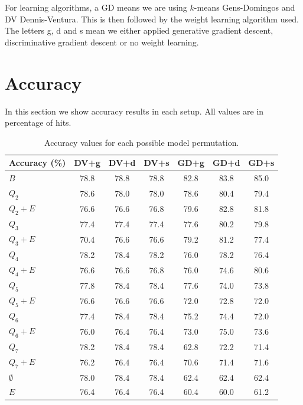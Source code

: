 For learning algorithms, a GD means we are using $k$-means Gens-Domingos and DV Dennis-Ventura.
This is then followed by the weight learning algorithm used. The letters g, d and s mean we either
applied generative gradient descent, discriminative gradient descent or no weight learning.

\section{Accuracy}

In this section we show accuracy results in each setup. All values are in percentage of hits.

\begin{table}[h]
  \centering
  \begin{tabular}{l|c|c|c|c|c|c}
    \hline
    \multicolumn{1}{c}{\bfseries Accuracy (\%)} & \multicolumn{1}{c}{\bfseries DV+g} &
    \multicolumn{1}{c}{\bfseries DV+d} & \multicolumn{1}{c}{\bfseries DV+s} &
    \multicolumn{1}{c}{\bfseries GD+g} & \multicolumn{1}{c}{\bfseries GD+d} &
    \multicolumn{1}{c}{\bfseries GD+s}\\
    \hline
    $B$         & 78.8 & 78.8 & 78.8 & 82.8 & 83.8 & 85.0\\
    $Q_2$       & 78.6 & 78.0 & 78.0 & 78.6 & 80.4 & 79.4\\
    $Q_2+E$     & 76.6 & 76.6 & 76.8 & 79.6 & 82.8 & 81.8\\
    $Q_3$       & 77.4 & 77.4 & 77.4 & 77.6 & 80.2 & 79.8\\
    $Q_3+E$     & 70.4 & 76.6 & 76.6 & 79.2 & 81.2 & 77.4\\
    $Q_4$       & 78.2 & 78.4 & 78.2 & 76.0 & 78.2 & 76.4\\
    $Q_4+E$     & 76.6 & 76.6 & 76.8 & 76.0 & 74.6 & 80.6\\
    $Q_5$       & 77.8 & 78.4 & 78.4 & 77.6 & 74.0 & 73.8\\
    $Q_5+E$     & 76.6 & 76.6 & 76.6 & 72.0 & 72.8 & 72.0\\
    $Q_6$       & 77.4 & 78.4 & 78.4 & 75.2 & 74.4 & 72.0\\
    $Q_6+E$     & 76.0 & 76.4 & 76.4 & 73.0 & 75.0 & 73.6\\
    $Q_7$       & 78.2 & 78.4 & 78.4 & 62.8 & 72.2 & 71.4\\
    $Q_7+E$     & 76.2 & 76.4 & 76.4 & 70.6 & 71.4 & 71.6\\
    $\emptyset$ & 78.0 & 78.4 & 78.4 & 62.4 & 62.4 & 62.4\\
    $E$         & 76.4 & 76.4 & 76.4 & 60.4 & 60.0 & 61.2\\
  \end{tabular}
  \caption{Accuracy values for each possible model permutation.\label{tab:accuracy}}
\end{table}

